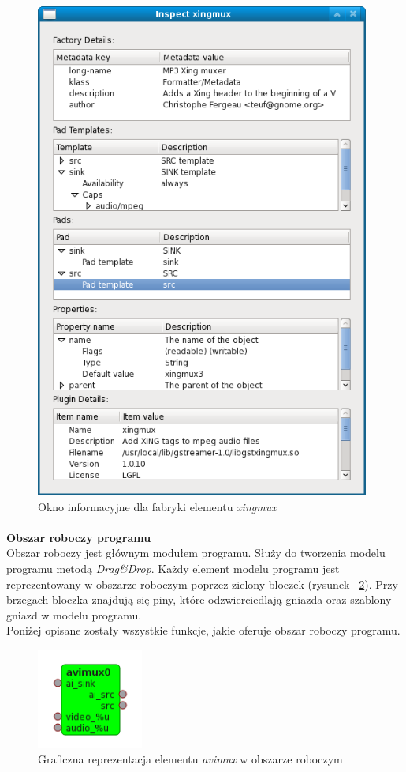 \documentclass[12pt]{article}
\begin{document}
\begin{figure}[H]
  \includegraphics[width=110mm]{img/xingmux-factory-info-window.png}
  \caption{Okno informacyjne dla fabryki elementu \textit{xingmux}}
  \label{fig:xingmuxFactoryInfoWindow}
\end{figure}\paragraph{}\vspace{-3mm}
\textbf{Obszar roboczy programu} \\
Obszar roboczy jest głównym modułem programu. Służy do tworzenia modelu programu metodą \textit{Drag\&Drop}. Każdy element modelu programu jest reprezentowany w obszarze roboczym poprzez zielony bloczek (rysunek ~\ref{fig:sampleBlock}). Przy brzegach bloczka znajdują się piny, które odzwierciedlają gniazda oraz szablony gniazd w modelu programu. \\
Poniżej opisane zostały wszystkie funkcje, jakie oferuje obszar roboczy programu.
\begin{figure}[H]
  \includegraphics[width=35mm]{img/sample-block.png}
  \caption{Graficzna reprezentacja elementu \textit{avimux} w obszarze roboczym}
  \label{fig:sampleBlock}
\end{figure}
\end{document}
